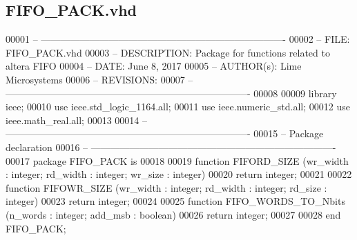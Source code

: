 \subsection{F\+I\+F\+O\+\_\+\+P\+A\+C\+K.\+vhd}
\label{FIFO__PACK_8vhd_source}

\begin{DoxyCode}
00001 \textcolor{keyword}{-- ---------------------------------------------------------------------------- }
00002 \textcolor{keyword}{-- FILE:    FIFO\_PACK.vhd}
00003 \textcolor{keyword}{-- DESCRIPTION: Package for functions related to altera FIFO}
00004 \textcolor{keyword}{-- DATE:    June 8, 2017}
00005 \textcolor{keyword}{-- AUTHOR(s):   Lime Microsystems}
00006 \textcolor{keyword}{-- REVISIONS:}
00007 \textcolor{keyword}{-- ----------------------------------------------------------------------------}
00008 
00009 \textcolor{vhdlkeyword}{library }\textcolor{keywordflow}{ieee};
00010 \textcolor{vhdlkeyword}{use }ieee.std\_logic\_1164.\textcolor{keywordflow}{all};
00011 \textcolor{vhdlkeyword}{use }ieee.numeric\_std.\textcolor{keywordflow}{all};
00012 \textcolor{vhdlkeyword}{use }ieee.math\_real.\textcolor{keywordflow}{all};
00013 
00014 \textcolor{keyword}{-- ----------------------------------------------------------------------------}
00015 \textcolor{keyword}{-- Package declaration}
00016 \textcolor{keyword}{-- ----------------------------------------------------------------------------}
00017 \textcolor{keywordflow}{package }FIFO_PACK \textcolor{keywordflow}{is}
00018 
00019    \textcolor{keywordflow}{function} FIFORD_SIZE (wr\_width : \textcolor{comment}{integer}; rd\_width : \textcolor{comment}{integer}; wr\_size : \textcolor{comment}{integer})
00020       \textcolor{keywordflow}{return} \textcolor{comment}{integer};
00021       
00022    \textcolor{keywordflow}{function} FIFOWR_SIZE (wr\_width : \textcolor{comment}{integer}; rd\_width : \textcolor{comment}{integer}; rd\_size : \textcolor{comment}{integer})
00023       \textcolor{keywordflow}{return} \textcolor{comment}{integer};
00024       
00025    \textcolor{keywordflow}{function} FIFO_WORDS_TO_Nbits (n\_words : \textcolor{comment}{integer}; add\_msb : \textcolor{comment}{boolean})
00026       \textcolor{keywordflow}{return} \textcolor{comment}{integer};
00027       
00028 \textcolor{keywordflow}{end}  \textcolor{vhdlchar}{FIFO\_PACK};

\end{DoxyCode}
